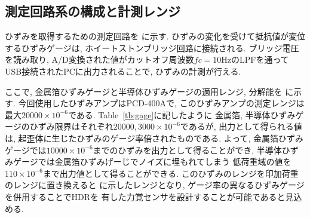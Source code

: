 \subsection{測定回路系の構成と計測レンジ}
ひずみを取得するための測定回路を%
に示す. 
ひずみの変化を受けて抵抗値が変位するひずみゲージは, 
ホイートストンブリッジ回路に接続される. 
ブリッジ電圧を読み取り, A/D変換された値がカットオフ周波数$fc = 10$HzのLPFを通って
USB接続されたPCに出力されることで, ひずみの計測が行える. 

ここで, 金属箔ひずみゲージと半導体ひずみゲージの適用レンジ, 
分解能を%
に示す. 
今回使用したひずみアンプはPCD-400Aで, このひずみアンプの測定レンジは
最大$20000×10^{-6}$である. Table~\ref{tb:gage}に記したように
金属箔, 半導体ひずみゲージのひずみ限界はそれぞれ$20000, 3000×10^{-6}$であるが, 
出力として得られる値は, 起歪体に生じたひずみのゲージ率倍されたものである. 
よって, 金属箔ひずみゲージでは$10000×10^{-6}$までのひずみを出力として得ることができ, 
半導体ひずみゲージでは金属箔ひずみげーじでノイズに埋もれてしまう
低荷重域の値を$110×10^{-6}$まで出力値として得ることができる. 
このひずみのレンジを印加荷重のレンジに置き換えると%
に示したレンジとなり, ゲージ率の異なるひずみゲージを併用することでHDRを
有した力覚センサを設計することが可能であると見込める. 



